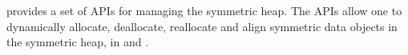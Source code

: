 \openshmem provides a set of \ac{API}s for managing the symmetric heap. The \ac{API}s allow one to dynamically allocate, deallocate, reallocate and align symmetric data objects in the symmetric heap, in \Clang{} and \Fortran.
